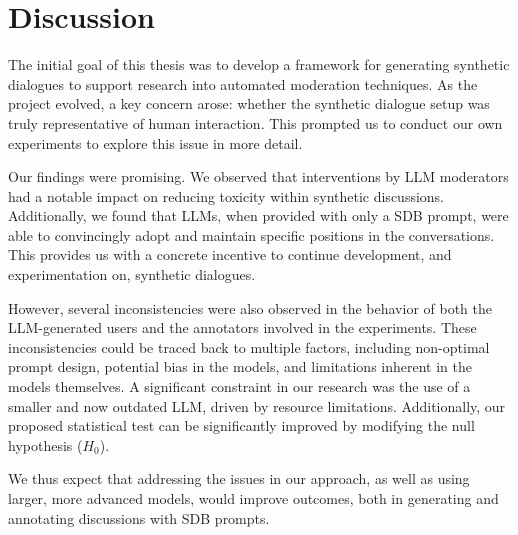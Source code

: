%
\chapter{Discussion}
\label{sec:discusision}

The initial goal of this thesis was to develop a framework for generating synthetic dialogues to support research into automated moderation techniques. As the project evolved, a key concern arose: whether the synthetic dialogue setup was truly representative of human interaction. This prompted us to conduct our own experiments to explore this issue in more detail.

Our findings were promising. We observed that interventions by LLM moderators had a notable impact on reducing toxicity within synthetic discussions. Additionally, we found that LLMs, when provided with only a \ac{SDB} prompt, were able to convincingly adopt and maintain specific positions in the conversations. This provides us with a concrete incentive to continue development, and experimentation on, synthetic dialogues.

However, several inconsistencies were also observed in the behavior of both the LLM-generated users and the annotators involved in the experiments. These inconsistencies could be traced back to multiple factors, including non-optimal prompt design, potential bias in the models, and limitations inherent in the models themselves. A significant constraint in our research was the use of a smaller and now outdated LLM, driven by resource limitations. Additionally, our proposed statistical test can be significantly improved by modifying the null hypothesis ($H_0$). 

We thus expect that addressing the issues in our approach, as well as using larger, more advanced models, would improve outcomes, both in generating and annotating discussions with \ac{SDB} prompts.